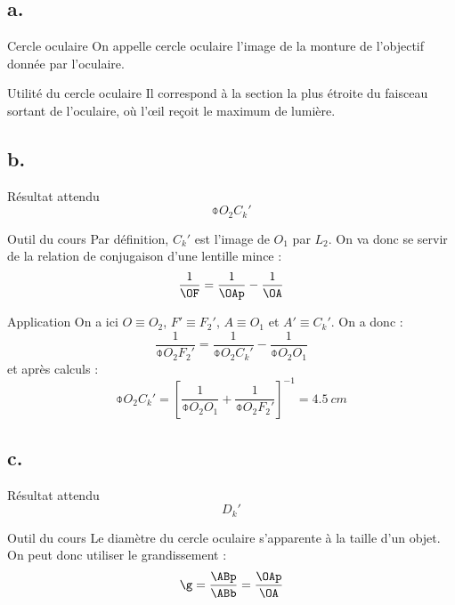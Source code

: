 \documentclass[10pt,notitlepage]{book}
\begin{document}
\subsection{a.}
\begin{defi}{Cercle oculaire}
    On appelle cercle oculaire l'image de la monture de l'objectif donnée par
    l'oculaire.
\end{defi}

\begin{inte}{Utilité du cercle oculaire}
    Il correspond à la section la plus étroite du faisceau sortant de
    l'oculaire, où l'œil reçoit le maximum de lumière.  
\end{inte}

\setcounter{subsection}{2}
\subsection{b.}
\begin{NCprop}{Résultat attendu}
    $$\obar{O_2C_k'}$$
\end{NCprop}

\begin{NCdemo}{Outil du cours}
    Par définition, $C_k'$ est l'image de $O_1$ par $L_2$. On va donc se servir
    de la relation de conjugaison d'une lentille mince :
    \[ \frac{1}{\OF} = \frac{1}{\OAp} - \frac{1}{\OA} \]
\end{NCdemo}

\begin{NCexem}{Application}
    On a ici $O \equiv O_2$, $F' \equiv F_2'$, $A \equiv O_1$ et $A' \equiv
    C_k'$. On a donc :
    \[ \frac{1}{\obar{O_2F_2'}} = \frac{1}{\obar{O_2C_k'}} -
    \frac{1}{\obar{O_2O_1}} \]
    et après calculs :
    \[ \boxed{\obar{O_2C_k'} = \left[ \frac{1}{\obar{O_2O_1}} +
    \frac{1}{\obar{O_2F_2'}}\right]^{-1} = \SI{+4.5}{cm}} \]
\end{NCexem}

\setcounter{subsection}{2}
\subsection{c.}
\begin{NCprop}{Résultat attendu}
    $$D_k'$$
\end{NCprop}

\begin{NCdemo}{Outil du cours}
    Le diamètre du cercle oculaire s'apparente à la taille d'un objet. On peut
    donc utiliser le grandissement :
    \[ \g = \frac{\ABp}{\ABb} = \frac{\OAp}{\OA} \]
\end{NCdemo}
\end{document}

